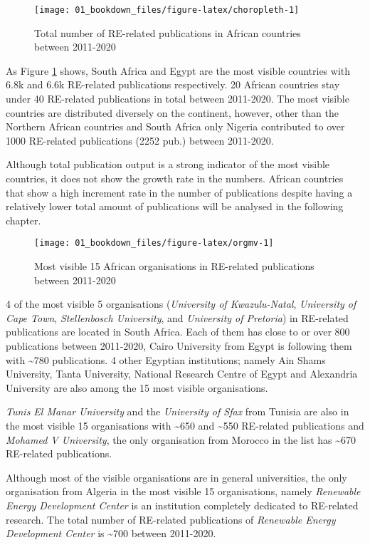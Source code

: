 \documentclass[12pt,twoside]{report}
\begin{document}
\begin{figure}
\texttt{[image: 01\_bookdown\_files/figure-latex/choropleth-1]} \caption{Total number of RE-related publications in African countries between 2011-2020}\label{fig:choropleth}
\end{figure}

As Figure \ref{fig:choropleth} shows, South Africa and Egypt are the most visible countries with 6.8k and 6.6k RE-related publications respectively. 20 African countries stay under 40 RE-related
publications in total between 2011-2020. The most visible countries are distributed diversely on the continent, however, other than the Northern African countries and South Africa only Nigeria contributed to over 1000 RE-related publications (2252 pub.) between 2011-2020.

Although total publication output is a strong indicator of the most visible countries, it does not show the growth rate in the numbers. African countries that show a high increment rate in the number of publications despite having a relatively lower total amount of publications will be analysed in the following chapter.

\begin{figure}
\texttt{[image: 01\_bookdown\_files/figure-latex/orgmv-1]} \caption{Most visible 15 African organisations in RE-related publications between 2011-2020}\label{fig:orgmv}
\end{figure}

4 of the most visible 5 organisations (\emph{University of Kwazulu-Natal}, \emph{University of Cape Town}, \emph{Stellenbosch University}, and \emph{University of Pretoria}) in RE-related publications are located in South Africa. Each of them has close to or over 800 publications between 2011-2020, Cairo University from Egypt is following them with \textasciitilde780 publications. 4 other Egyptian institutions; namely Ain Shams University, Tanta University, National Research Centre of Egypt and Alexandria University are also among the 15 most visible organisations.

\emph{Tunis El Manar University} and the \emph{University of Sfax} from Tunisia are also in the most visible 15 organisations with \textasciitilde650 and \textasciitilde550 RE-related publications and \emph{Mohamed V University}, the only organisation from Morocco in the list has \textasciitilde670 RE-related publications.

Although most of the visible organisations are in general universities, the only organisation from Algeria in the most visible 15 organisations, namely \emph{Renewable Energy Development Center} is an institution completely dedicated to RE-related research. The total number of RE-related publications of \emph{Renewable Energy Development Center} is \textasciitilde700 between 2011-2020.
\end{document}
